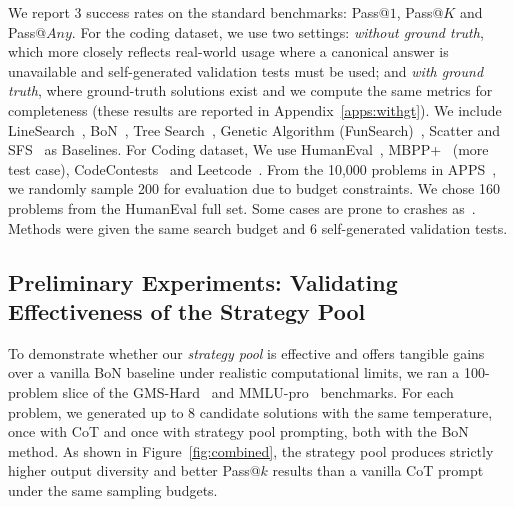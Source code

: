 \documentclass[11pt]{article}
\theoremstyle{definition}
\theoremstyle{remark}
\begin{document}
We report 3 success rates on the standard benchmarks: Pass@\!$1$, Pass@\!$K$ and Pass@\!$Any$. For the coding dataset, we use two settings: \emph{without ground truth}, which more closely reflects real-world usage where a canonical answer is unavailable and self-generated validation tests must be used; and \emph{with ground truth}, where ground-truth solutions exist and we compute the same metrics for completeness (these results are reported in Appendix~\ref{apps:withgt}). We include LineSearch~\citep{shinn2023reflexion}, BoN~\citep{brown2024largelanguagemonkeysscaling}, Tree Search~\citep{yao2023tree}, Genetic Algorithm (FunSearch)~\citep{FunSearch2023}, Scatter and SFS~\citep{light2025sfs} as Baselines. For Coding dataset, We use HumanEval~\citep{chen2021evaluating}, MBPP+~\citep{austin2021program} (more test case), CodeContests~\citep{doi:10.1126/science.abq1158} and Leetcode~\citep{guo2024deepseek}. From the 10,000 problems in APPS~\citep{hendrycks2021measuring}, we randomly sample 200 for evaluation due to budget constraints. We chose 160 problems from the HumanEval full set. Some cases are prone to crashes as~\citep{light2025sfs}. Methods were given the same search budget and 6 self-generated validation tests.

\subsection{Preliminary Experiments: Validating Effectiveness of the Strategy Pool}

To demonstrate whether our \textit{strategy pool} is effective and offers tangible gains over a vanilla BoN baseline under realistic computational limits, we ran a 100-problem slice of the GMS-Hard~\citep{gao2023pal} and MMLU-pro~\citep{wang2024mmlu} benchmarks. For each problem, we generated up to 8 candidate solutions with the same temperature, once with CoT and once with strategy pool prompting, both with the BoN method. As shown in Figure~\ref{fig:combined}, the strategy pool produces strictly higher output diversity and better Pass@\!$k$ results than a vanilla CoT prompt under the same sampling budgets.
\end{document}
